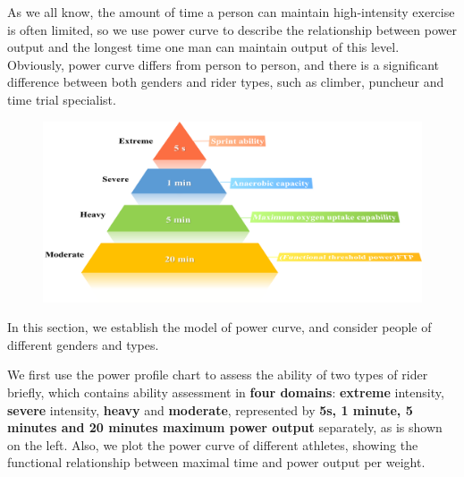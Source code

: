 \begin{flushleft}
\qquad As we all know, the amount of time a person can maintain high-intensity exercise is often limited, so we use power curve to describe the relationship between power output and the longest time one man can maintain output of this level. Obviously, power curve differs from person to person, and there is a significant difference between both genders and rider types, such as climber, puncheur and time trial specialist. 
\end{flushleft}
\begin{figure} %
\includegraphics[width=0.9\linewidth]{image/pyramid}
\label{pyramid}
\end{figure}
	\par In this section, we establish the model of power curve, and consider people of different genders and types. 
	\par We first use the power profile chart to assess the ability of two types of rider briefly, which contains ability assessment in {\bf four domains}: {\bf extreme} intensity, {\bf severe} intensity, {\bf heavy} and {\bf moderate}, represented by {\bf 5s, 1 minute, 5 minutes and 20 minutes maximum power output} separately, as is shown on the left. Also, we plot the power curve of different athletes, showing the functional relationship  between maximal time and power output per weight. 